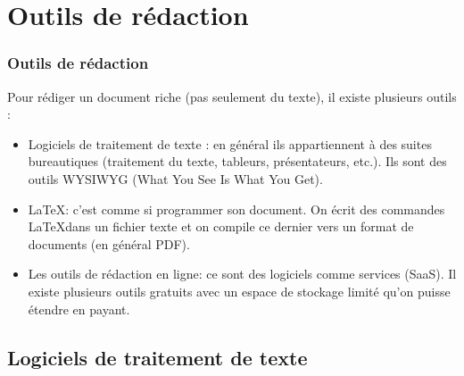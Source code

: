 \documentclass[xcolor=table]{beamer}
\begin{document}
\section{Outils de rédaction}

\begin{frame}
\frametitle{Outils de rédaction}

Pour rédiger un document riche (pas seulement du texte), il existe plusieurs outils :
%
\begin{itemize}
	\item Logiciels de traitement de texte : en général ils appartiennent à des suites bureautiques (traitement du texte, tableurs, présentateurs, etc.). Ils sont des outils WYSIWYG (What You See Is What You Get).
	\item \LaTeX : c'est comme si programmer son document. On écrit des commandes \LaTeX dans un fichier texte et on compile ce dernier vers un format de documents (en général PDF). 
	\item Les outils de rédaction en ligne: ce sont des logiciels comme services (SaaS). Il existe plusieurs outils gratuits avec un espace de stockage limité qu'on puisse étendre en payant.
\end{itemize}
\end{frame}

\subsection{Logiciels de traitement de texte}
\end{document}

